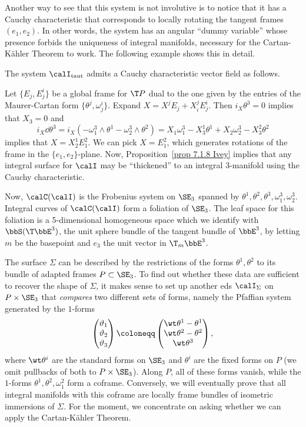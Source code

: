 Another way to see that this system is not involutive is to notice that it has a Cauchy characteristic that corresponds to locally rotating the tangent frames $(e_1,e_2)$. In other words, the system has an angular ``dummy variable'' whose presence forbids the uniqueness of integral manifolds, necessary for the Cartan-K\"ahler Theorem to work. The following example shows this in detail.

\begin{example}\label{ex 7.1.10 Ivey}
    The system $\calI_{\mathrm{taut}}$ admits a Cauchy characteristic vector field as follows.

    Let $\{E_j,E^i_j\}$ be a global frame for $\T P$ dual to the one given by the entries of the Maurer-Cartan form $\{\theta^j,\omega^i_j\}$. Expand $X=X^jE_j+X^j_i E^i_j$. Then $i_X\theta^3=0$ implies that $X_3=0$ and 
    \[i_X \dd\theta^3=i_X(-\omega^3_1\wedge\theta^1-\omega^3_2\wedge\theta^2)=X_1\omega^3_1-X^1_3\theta^1+X_2\omega^3_2-X^2_3\theta^2\]
    implies that $X=X^1_2 E^2_1$. We can pick $X=E^2_1$, which generates rotations of the frame in the $\{e_1,e_2\}$-plane. Now, Proposition~\ref{prop 7.1.8 Ivey} implies that any integral surface for $\calI$ may be ``thickened'' to an integral $3$-manifold using the Cauchy characteristic.

    Now, $\calC(\calI)$ is the Frobenius system on $\SE_3$ spanned by $\theta^1,\theta^2,\theta^3,\omega^3_1,\omega^3_2$. Integral curves of $\calC(\calI)$ form a foliation of $\SE_3$. The leaf space for this foliation is a 5-dimensional homogeneous space which we identify with $\bbS(\T\bbE^3)$, the unit sphere bundle of the tangent bundle of $\bbE^3$, by letting $m$ be the basepoint and $e_3$ the unit vector in $\T_m\bbE^3$.
\end{example}

The surface $\Sigma$ can be described by the restrictions of the forms $\theta^1,\theta^2$ to its bundle of adapted frames $P\subset \SE_3$. To find out whether these data are sufficient to recover the shape of $\Sigma$, it makes sense to set up another \gls{eds} $\calI_\Sigma$ on $P\times\SE_3$ that \emph{compares} two different sets of forms, namely the Pfaffian system generated by the $1$-forms 
\[\begin{pmatrix}
    \vartheta_1\\\vartheta_2\\\vartheta_3
\end{pmatrix}\coloneqq 
\begin{pmatrix}
    \wt\theta^1-\theta^1\\
    \wt\theta^2-\theta^2\\
    \wt\theta^3
\end{pmatrix},
\]
where $\wt\theta^i$ are the standard forms on $\SE_3$ and $\theta^i$ are the fixed forms on $P$ (we omit pullbacks of both to $P\times\SE_3$). Along $P$, all of these forms vanish, while the $1$-forms $\theta^1,\theta^2,\omega^2_1$ form a coframe. Conversely, we will eventually prove that all integral manifolds with this coframe are locally frame bundles of isometric immersions of $\Sigma$. For the moment, we concentrate on asking whether we can apply the Cartan-K\"ahler Theorem.

